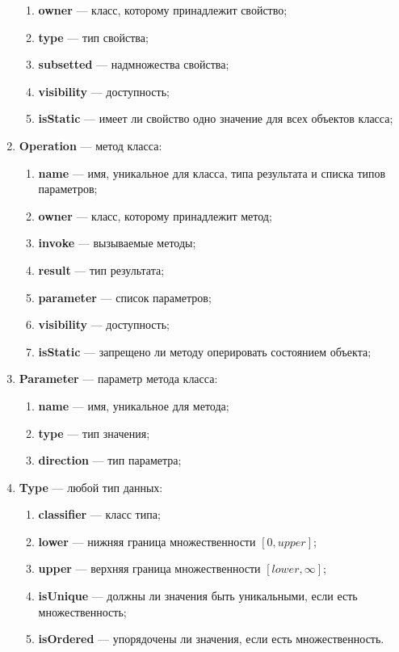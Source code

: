 \begin{enumerate}
\begin{enumerate}
    \item \textbf{owner} --- класс, которому принадлежит свойство;
    \item \textbf{type} --- тип свойства;
    \item \textbf{subsetted} --- надмножества свойства;
    \item \textbf{visibility} --- доступность;
    \item \textbf{isStatic} --- имеет ли свойство одно значение для всех объектов класса;
    \end{enumerate}
\item \textbf{Operation} --- метод класса:
    \begin{enumerate}
    \item \textbf{name} --- имя, уникальное для класса, типа результата и списка типов параметров;
    \item \textbf{owner} --- класс, которому принадлежит метод;
    \item \textbf{invoke} --- вызываемые методы;
    \item \textbf{result} --- тип результата;
    \item \textbf{parameter} --- список параметров;
    \item \textbf{visibility} --- доступность;
    \item \textbf{isStatic} --- запрещено ли методу оперировать состоянием объекта;
    \end{enumerate}
\item \textbf{Parameter} --- параметр метода класса:
    \begin{enumerate}
    \item \textbf{name} --- имя, уникальное для метода;
    \item \textbf{type} --- тип значения;
    \item \textbf{direction} --- тип параметра;
    \end{enumerate}
\item \textbf{Type} --- любой тип данных:
    \begin{enumerate}
    \item \textbf{classifier} --- класс типа;
    \item \textbf{lower} --- нижняя граница множественности $\left [ 0, upper \right ]$;
    \item \textbf{upper} --- верхняя граница множественности $\left [ lower, \infty \right ]$;
    \item \textbf{isUnique} --- должны ли значения быть уникальными, если есть множественность;
    \item \textbf{isOrdered} --- упорядочены ли значения, если есть множественность.
    \end{enumerate}
\end{enumerate}

